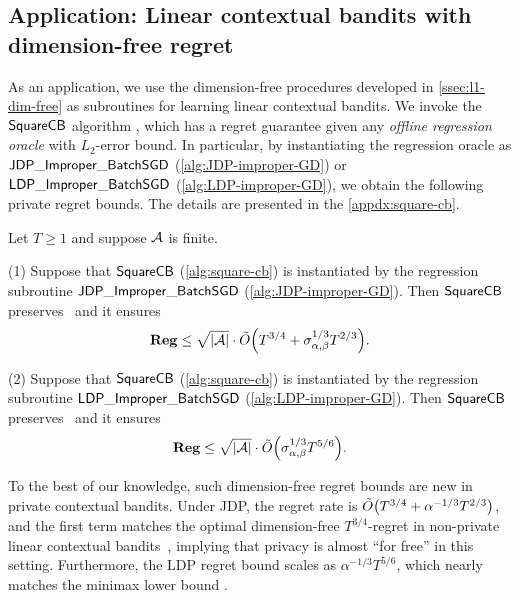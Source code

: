\subsection{Application: Linear contextual bandits with dimension-free regret} 

As an application, we use the dimension-free procedures developed in \cref{ssec:l1-dim-free} as subroutines for learning linear contextual bandits.
We invoke the $\mathsf{SquareCB}$ algorithm \citep{abe1999associative,foster2020beyond,simchi2020bypassing}, which has a regret guarantee given any \emph{offline regression oracle} with $L_2$-error bound. In particular, by instantiating the regression oracle as $\mathsf{JDP\_Improper\_BatchSGD}$ (\cref{alg:JDP-improper-GD}) or $\mathsf{LDP\_Improper\_BatchSGD}$ (\cref{alg:LDP-improper-GD}), we obtain the following private regret bounds. The details are presented in the \cref{appdx:square-cb}.
\begin{theorem}\label{thm:regret-dim-free}
Let $T\geq 1$ and suppose $\mathcal{A}$ is finite.

(1) Suppose that $\mathsf{SquareCB}$ (\cref{alg:square-cb}) is instantiated by the regression subroutine $\mathsf{JDP\_Improper\_BatchSGD}$ (\cref{alg:JDP-improper-GD}). Then $\mathsf{SquareCB}$ preserves \aJDP~and it ensures 
\begin{align*}
    \mathbf{Reg}\leq \sqrt{|\mathcal{A}|}\cdot \tilde{O}{\left( T^{3/4}+\sigma_{\alpha,\beta}^{1/3}T^{2/3} \right)}.
\end{align*}

(2) Suppose that $\mathsf{SquareCB}$ (\cref{alg:square-cb}) is instantiated by the regression subroutine $\mathsf{LDP\_Improper\_BatchSGD}$ (\cref{alg:LDP-improper-GD}). Then $\mathsf{SquareCB}$ preserves \aLDP~and it ensures 
\begin{align*}
    \mathbf{Reg}\leq \sqrt{|\mathcal{A}|}\cdot \tilde{O}{\left( \sigma_{\alpha,\beta}^{1/3}T^{5/6} \right)}.
\end{align*}
\end{theorem}

To the best of our knowledge, such dimension-free regret bounds are new in private contextual bandits. Under JDP, the regret rate is $\tilde{O}{\left( T^{3/4}+\alpha^{-1/3}T^{2/3} \right)}$, and the first term matches the optimal dimension-free $T^{3/4}$-regret in non-private linear contextual bandits~\citep{abe1999associative,foster2020beyond}, implying that privacy is almost ``for free'' in this setting. Furthermore, the LDP regret bound scales as $\alpha^{-1/3}T^{5/6}$, which nearly matches the minimax lower bound \citep[Corollary I.15]{chen2024private}. 



